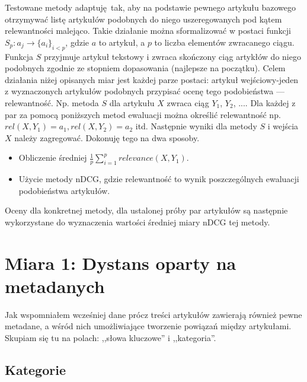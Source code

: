 \documentclass[pl]{minipw} %
\begin{document}
Testowane metody adaptuję tak, aby na podstawie pewnego artykułu bazowego otrzymywać listę artykułów podobnych do niego uszeregowanych pod kątem relewantności malejąco. Takie działanie można sformalizować w postaci funkcji $S_p: a_j \to \{a_{i}\}_{i < p}$, gdzie $a$ to artykuł, a $p$ to liczba elementów zwracanego ciągu. Funkcja $S$ przyjmuje artykuł tekstowy i zwraca skończony ciąg artykłów do niego podobnych zgodnie ze stopniem dopasowania (najlepsze na początku). Celem działania niżej opisanych miar jest każdej parze postaci: artykuł wejściowy-jeden z wyznaczonych artykułów podobnych przypisać ocenę tego podobieństwa --- relewantność. Np. metoda $S$ dla artykułu $X$ zwraca ciąg {$Y_1$, $Y_2$, ...}. Dla każdej z par za pomocą poniższych metod ewaluacji można określić relewantność np.~$rel(X, Y_1) = a_1, rel(X, Y_2) = a_2$ itd. Następnie wyniki dla metody $S$ i wejścia $X$ należy zagregować. Dokonuję tego na dwa sposoby.
\begin{itemize}
	\item Obliczenie średniej $\frac{1}{p}\sum_{i=1}^{p}relevance(X,Y_1)$.
	\item Użycie metody nDCG, gdzie relewantność to wynik poszczególnych ewaluacji podobieństwa artykułów.
\end{itemize}  


Oceny dla konkretnej metody, dla ustalonej próby par artykułów są następnie wykorzystane do wyznaczenia wartości średniej  miary nDCG tej metody.


\section{Miara 1: Dystans oparty na metadanych}

Jak wspomniałem wcześniej dane prócz treści artykułów zawierają również pewne metadane, a wśród nich umożliwiające tworzenie powiązań między artykułami. Skupiam się tu na polach: ,,słowa kluczowe'' i ,,kategoria''.

\subsection{Kategorie} 
\end{document}
